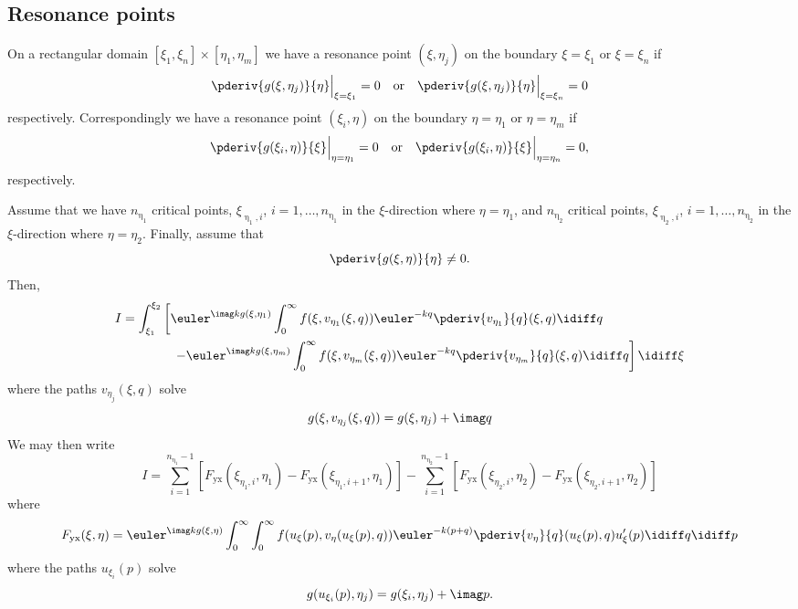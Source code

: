 \subsection{Resonance points}
On a rectangular domain $[\xi_1,\xi_n]\times[\eta_1,\eta_m]$ we have a resonance point $(\xi,\eta_j)$ on the boundary $\xi=\xi_1$ or $\xi=\xi_n$ if
\begin{equation*}
	\pderiv{g(\xi,\eta_j)}{\eta}\Big\vert_{\xi=\xi_1} = 0\quad\text{or}\quad \pderiv{g(\xi,\eta_j)}{\eta}\Big\vert_{\xi=\xi_n} = 0
\end{equation*}
respectively. Correspondingly we have a resonance point $(\xi_i,\eta)$ on the boundary $\eta=\eta_1$ or $\eta=\eta_m$ if
\begin{equation*}
	\pderiv{g(\xi_i,\eta)}{\xi}\Big\vert_{\eta=\eta_1} = 0\quad\text{or}\quad \pderiv{g(\xi_i,\eta)}{\xi}\Big\vert_{\eta=\eta_n} = 0,
\end{equation*}
respectively.

Assume that we have $n_{\upeta_1}$ critical points, $\xi_{\upeta_1,i}$, $i=1,\dots,n_{\upeta_1}$ in the $\xi$-direction where $\eta=\eta_1$, and $n_{\upeta_2}$ critical points, $\xi_{\upeta_2,i}$, $i=1,\dots,n_{\upeta_2}$ in the $\xi$-direction where $\eta=\eta_2$. Finally, assume that
\begin{equation*}
	\pderiv{g(\xi,\eta)}{\eta}\neq 0.
\end{equation*}
Then,
\begin{align*}
	I &= \int_{\xi_1}^{\xi_2}\left[\euler^{\imag k g(\xi,\eta_1)}\int_0^\infty f(\xi,v_{\eta_1}(\xi,q))\euler^{-k q}\pderiv{v_{\eta_1}}{q}(\xi,q)\idiff q\right.\\
	&{\hskip4em\relax}\left. -\euler^{\imag k g(\xi,\eta_m)}\int_0^\infty f(\xi,v_{\eta_m}(\xi,q))\euler^{-k q}\pderiv{v_{\eta_m}}{q}(\xi,q)\idiff q\right]\idiff \xi
\end{align*}
where the paths $v_{\eta_j}(\xi,q)$ solve
\begin{equation*}
	g(\xi, v_{\eta_j}(\xi,q)) = g(\xi,\eta_j) + \imag q
\end{equation*}
We may then write
\begin{equation*}
	I = \sum_{i=1}^{n_{\upeta_1}-1} [F_{\mathrm{yx}}(\xi_{\eta_1,i},\eta_1) - F_{\mathrm{yx}}(\xi_{\eta_1,i+1},\eta_1)] - \sum_{i=1}^{n_{\upeta_2}-1} [F_{\mathrm{yx}}(\xi_{\eta_2,i},\eta_2) - F_{\mathrm{yx}}(\xi_{\eta_2,i+1},\eta_2)]
\end{equation*}
where
\begin{equation*}
	F_{\mathrm{yx}}(\xi,\eta) = \euler^{\imag k g(\xi,\eta)}\int_0^\infty\int_0^\infty f(u_{\xi}(p),v_{\eta}(u_{\xi}(p),q))\euler^{-k (p+q)}\pderiv{v_{\eta}}{q}(u_{\xi}(p),q)u_{\xi}'(p)\idiff q\idiff p
\end{equation*}
where the paths $u_{\xi_i}(p)$ solve
\begin{equation*}
	g(u_{\xi_i}(p), \eta_j) = g(\xi_i,\eta_j) + \imag p.
\end{equation*}

